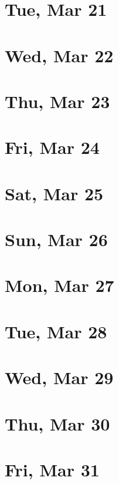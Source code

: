 	\section{Tue, Mar 21}
		
	\section{Wed, Mar 22}
		
	\section{Thu, Mar 23}
		
	\section{Fri, Mar 24}
		
	\section{Sat, Mar 25}
		
	\section{Sun, Mar 26}
		
	\section{Mon, Mar 27}
		
	\section{Tue, Mar 28}
		
	\section{Wed, Mar 29}
		
	\section{Thu, Mar 30}
		
	\section{Fri, Mar 31}
		
